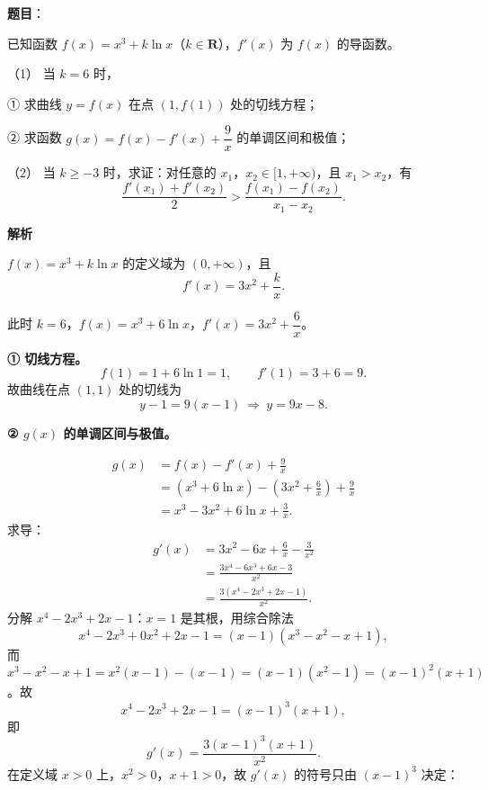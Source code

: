 \begin{answer}

\textbf{题目}：

已知函数 $f(x)=x^3+k\ln x$（$k\in\mathbf R$），$f'(x)$ 为 $f(x)$ 的导函数。

（1） 当 $k=6$ 时，

① 求曲线 $y=f(x)$ 在点 $(1,f(1))$ 处的切线方程；

② 求函数 $g(x)=f(x)-f'(x)+\dfrac9x$ 的单调区间和极值；

（2） 当 $k\geqslant-3$ 时，求证：对任意的 $x_1$，$x_2\in[1,+\infty)$，且 $x_1>x_2$，有
\nopagebreak[4]
\[\frac{f'(x_1)+f'(x_2)}{2}>\frac{f(x_1)-f(x_2)}{x_1-x_2}.\]

\textbf{解析}

$f(x)=x^3+k\ln x$ 的定义域为 $(0,+\infty)$，且
\nopagebreak[4]
\[f'(x)=3x^2+\frac kx .\]


此时 $k=6$，$f(x)=x^3+6\ln x$，$f'(x)=3x^2+\dfrac6x$。

\textbf{① 切线方程。}
\nopagebreak[4]
\[f(1)=1+6\ln1=1,\qquad f'(1)=3+6=9 .\]
故曲线在点 $(1,1)$ 处的切线为
\nopagebreak[4]
\[y-1=9(x-1)\ \Longrightarrow\ y=9x-8 .\]

\textbf{② $g(x)$ 的单调区间与极值。}

\nopagebreak[4]
\[\begin{aligned}
g(x)&=f(x)-f'(x)+\frac9x\\
&=\left(x^3+6\ln x\right)-\left(3x^2+\frac6x\right)+\frac9x\\
&=x^3-3x^2+6\ln x+\frac3x .
\end{aligned}\]
求导：
\nopagebreak[4]
\[\begin{aligned}
g'(x)&=3x^2-6x+\frac6x-\frac3{x^2}\\
&=\frac{3x^4-6x^3+6x-3}{x^2}\\
&=\frac{3\left(x^4-2x^3+2x-1\right)}{x^2} .
\end{aligned}\]
分解 $x^4-2x^3+2x-1$：$x=1$ 是其根，用综合除法
\nopagebreak[4]
\[x^4-2x^3+0x^2+2x-1=(x-1)\left(x^3-x^2-x+1\right),\]
而 $x^3-x^2-x+1=x^2(x-1)-(x-1)=(x-1)\left(x^2-1\right)=(x-1)^2(x+1)$。故
\nopagebreak[4]
\[x^4-2x^3+2x-1=(x-1)^3(x+1),\]
即
\nopagebreak[4]
\[g'(x)=\frac{3(x-1)^3(x+1)}{x^2} .\]
在定义域 $x>0$ 上，$x^2>0$，$x+1>0$，故 $g'(x)$ 的符号只由 $(x-1)^3$ 决定：


\end{answer}
